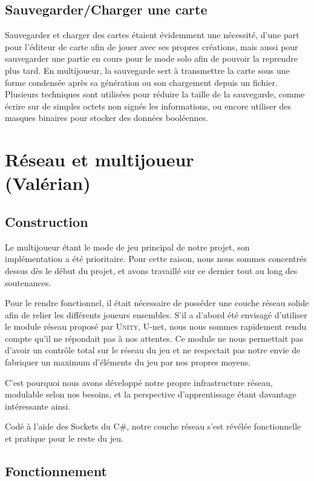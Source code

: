 \documentclass[12pt]{report}
\begin{document}
\section{Sauvegarder/Charger une carte}

Sauvegarder et charger des cartes étaient évidemment une nécessité, d’une part
pour l’éditeur de carte afin de jouer avec ses propres créations, mais aussi
pour sauvegarder une partie en cours pour le mode solo afin de pouvoir la
reprendre plus tard. En multijoueur, la sauvegarde sert à transmettre la carte
sous une forme condensée après sa génération ou son chargement depuis un
fichier. Plusieurs techniques sont utilisées pour réduire la taille de la
sauvegarde, comme écrire sur de simples octets non signés les informations, ou
encore utiliser des masques binaires pour stocker des données booléennes.

\chapter{Réseau et multijoueur \\ (Valérian)}

\section{Construction}

Le multijoueur étant le mode de jeu principal de notre projet, son
implémentation a été prioritaire. Pour cette raison, nous nous sommes concentrés
dessus dès le début du projet, et avons travaillé sur ce dernier tout au long
des soutenances.

Pour le rendre fonctionnel, il était nécessaire de posséder une couche réseau
solide afin de relier les différents joueurs ensembles. S’il a d’abord été
envisagé d’utiliser le module réseau proposé par \textsc{Unity}, U-net, nous
nous sommes rapidement rendu compte qu’il ne répondait pas à nos attentes. Ce
module ne nous permettait pas d’avoir un contrôle total sur le réseau du jeu et
ne respectait pas notre envie de fabriquer un maximum d’éléments du jeu par nos
propres moyens. 

C’est pourquoi nous avons développé notre propre infrastructure réseau,
modulable selon nos besoins, et la perspective d’apprentissage étant davantage
intéressante ainsi.

Codé à l’aide des Sockets du C\#, notre couche réseau s’est révélée
fonctionnelle et pratique pour le reste du jeu.

\section{Fonctionnement}
\end{document}
